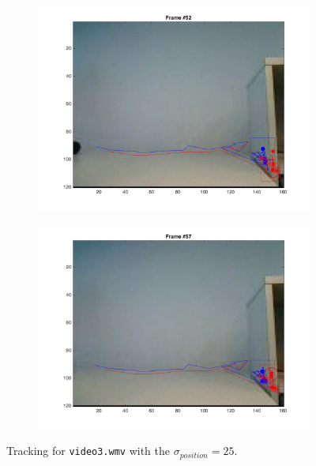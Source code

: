 \documentclass{ethz_report}
\begin{document}
\begin{figure}[h]
\begin{subfigure}[b]{.25\textwidth}
        \includegraphics[width=1\linewidth]{images/video3_noise_high_51}
    \end{subfigure}%
    \begin{subfigure}[b]{.25\textwidth}
        \centering
        \includegraphics[width=1\linewidth]{images/video3_noise_high_56}
    \end{subfigure}
    \caption{Tracking for \texttt{video3.wmv} with the $\sigma_{position} = 25$.}
    \label{fig:tracking_video3_noise_high}
\end{figure}
\end{document}
